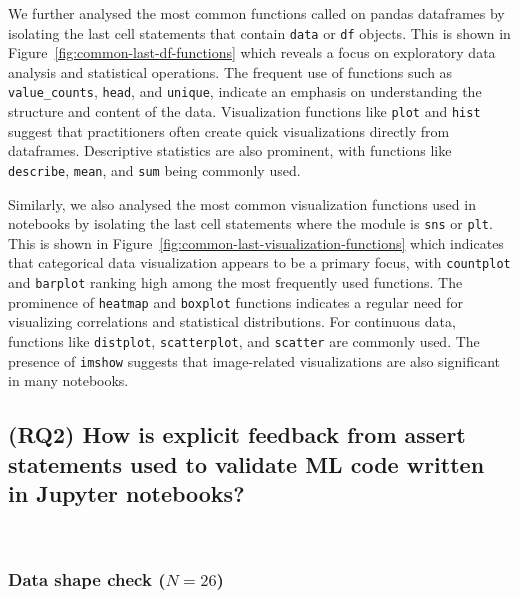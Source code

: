We further analysed the most common functions called on pandas dataframes by isolating the last cell statements that contain \lstinline{data} or \lstinline{df} objects. This is shown in Figure~\ref{fig:common-last-df-functions} which reveals a focus on exploratory data analysis and statistical operations. The frequent use of functions such as \lstinline{value_counts}, \lstinline{head}, and \lstinline{unique}, indicate an emphasis on understanding the structure and content of the data. Visualization functions like \lstinline{plot} and \lstinline{hist} suggest that practitioners often create quick visualizations directly from dataframes. Descriptive statistics are also prominent, with functions like \lstinline{describe}, \lstinline{mean}, and \lstinline{sum} being commonly used.

Similarly, we also analysed the most common visualization functions used in notebooks by isolating the last cell statements where the module is \lstinline{sns} or \lstinline{plt}. This is shown in Figure~\ref{fig:common-last-visualization-functions} which indicates that categorical data visualization appears to be a primary focus, with \lstinline{countplot} and \lstinline{barplot} ranking high among the most frequently used functions. The prominence of \lstinline{heatmap} and \lstinline{boxplot} functions indicates a regular need for visualizing correlations and statistical distributions. For continuous data, functions like \lstinline{distplot}, \lstinline{scatterplot}, and \lstinline{scatter} are commonly used. The presence of \lstinline{imshow} suggests that image-related visualizations are also significant in many notebooks.


\subsection{(RQ2) How is explicit feedback from assert statements used to validate ML code written in Jupyter notebooks?}~\label{sec:result-explicit}

\subsubsection{Data shape check ($N = 26$)}


